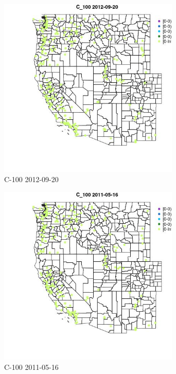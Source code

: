\begin{figure} 
\centering  
\includegraphics[width=0.77\textwidth]{Code_Outputs/ML_input_report_ML_input_PM25_Step5_part_d_de_duplicated_aves_ML_input_MapObsC_1002012-09-20.jpg} 
\caption{\label{fig:ML_input_report_ML_input_PM25_Step5_part_d_de_duplicated_aves_ML_inputMapObsC_1002012-09-20}C-100 2012-09-20} 
\end{figure} 
 

\begin{figure} 
\centering  
\includegraphics[width=0.77\textwidth]{Code_Outputs/ML_input_report_ML_input_PM25_Step5_part_d_de_duplicated_aves_ML_input_MapObsC_1002011-05-16.jpg} 
\caption{\label{fig:ML_input_report_ML_input_PM25_Step5_part_d_de_duplicated_aves_ML_inputMapObsC_1002011-05-16}C-100 2011-05-16} 
\end{figure} 
 

